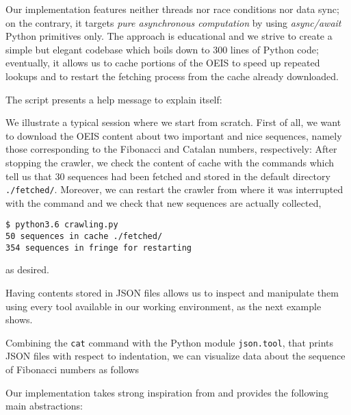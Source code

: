 Our implementation features neither threads nor race conditions nor data sync;
on the contrary, it targets \textit{pure asynchronous computation} by using
\textit{async/await} Python primitives only. The approach is educational and we
strive to create a simple but elegant codebase which boils down to $300$ lines
of Python code; eventually, it allows us to cache portions of the OEIS to speed
up repeated lookups and to restart the fetching process from the cache already
downloaded.

The script presents a help message to explain itself:

\begin{example}
We illustrate a typical session where we start from scratch. First of all, we
want to download the OEIS content about two important and nice sequences,
namely those corresponding to the Fibonacci and Catalan numbers, respectively:
After stopping the crawler, we check the content of cache with the commands
 which tell us that
$30$ sequences had been fetched and stored in the default directory
\verb|./fetched/|.  Moreover, we can restart the crawler from where it was
interrupted with the command
and we check that new sequences are actually collected,
\begin{Verbatim}[fontsize=\small]
$ python3.6 crawling.py
50 sequences in cache ./fetched/
354 sequences in fringe for restarting
\end{Verbatim}
as desired.
\end{example}

Having contents stored in JSON files allows us to inspect and manipulate them
using every tool available in our working environment, as the next example
shows.

\begin{example}
Combining the \verb|cat| command with the Python module \verb|json.tool|, that prints JSON files
with respect to indentation, we can visualize data about the sequence of Fibonacci
numbers as follows
\end{example}


Our implementation takes strong inspiration from
\citep{VANROSSUM:DAVIS:async:await} and provides the following main abstractions:

